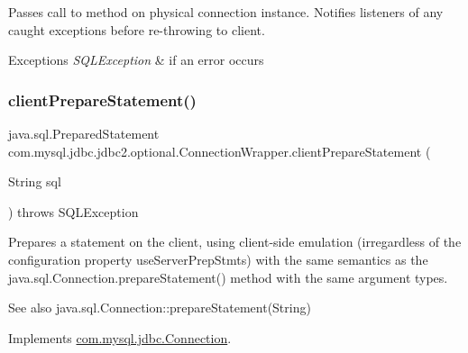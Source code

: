 Passes call to method on physical connection instance. Notifies listeners of any caught exceptions before re-\/throwing to client.


\begin{DoxyExceptions}{Exceptions}
{\em S\+Q\+L\+Exception} & if an error occurs \\
\hline
\end{DoxyExceptions}
\mbox{\label{classcom_1_1mysql_1_1jdbc_1_1jdbc2_1_1optional_1_1_connection_wrapper_a8c765f36b8ba9d9a0011768a878f3275}} 
\subsubsection{\texorpdfstring{client\+Prepare\+Statement()}{clientPrepareStatement()}\hspace{0.1cm}{\footnotesize\ttfamily [1/6]}}
{\footnotesize\ttfamily java.\+sql.\+Prepared\+Statement com.\+mysql.\+jdbc.\+jdbc2.\+optional.\+Connection\+Wrapper.\+client\+Prepare\+Statement (\begin{DoxyParamCaption}\item[{String}]{sql }\end{DoxyParamCaption}) throws S\+Q\+L\+Exception}

Prepares a statement on the client, using client-\/side emulation (irregardless of the configuration property \textquotesingle{}use\+Server\+Prep\+Stmts\textquotesingle{}) with the same semantics as the java.\+sql.\+Connection.\+prepare\+Statement() method with the same argument types.

\begin{DoxySeeAlso}{See also}
java.\+sql.\+Connection\+::prepare\+Statement(\+String) 
\end{DoxySeeAlso}


Implements \mbox{\hyperlink{interfacecom_1_1mysql_1_1jdbc_1_1_connection_a1836d2e9bc2f4f47fb77b2418d08616a}{com.\+mysql.\+jdbc.\+Connection}}.

